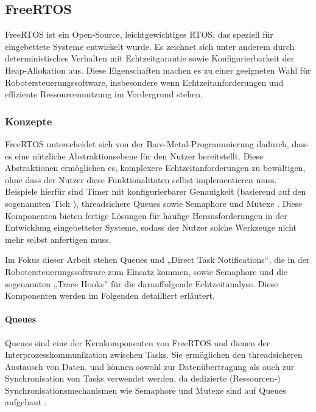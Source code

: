 \subsection{FreeRTOS}

FreeRTOS ist ein Open-Source, leichtgewichtiges \ac{RTOS}, das speziell für
eingebettete Systeme entwickelt wurde. Es zeichnet sich unter anderem durch
deterministisches Verhalten mit Echtzeitgarantie sowie Konfigurierbarkeit der
Heap-Allokation aus. Diese Eigenschaften machen es zu einer geeigneten Wahl für
Robotersteuerungssoftware, insbesondere wenn Echtzeitanforderungen und
effiziente Ressourcennutzung im Vordergrund stehen.

\subsubsection{Konzepte}

FreeRTOS unterscheidet sich von der Bare-Metal-Programmierung dadurch, dass es
eine nützliche Abstraktionsebene für den Nutzer bereitstellt. Diese
Abstraktionen ermöglichen es, komplexere Echtzeitanforderungen zu bewältigen,
ohne dass der Nutzer diese Funktionalitäten selbst implementieren muss.
Beispiele hierfür sind Timer mit konfigurierbarer Genauigkeit (basierend auf den
sogenannten Tick \cite{freertos_rtos_tick, freertos_tick_resolution}),
threadsichere Queues sowie Semaphore und Mutexe \cite{freertos_queues}. Diese
Komponenten bieten fertige Lösungen für häufige Herausforderungen in der
Entwicklung eingebetteter Systeme, sodass der Nutzer solche Werkzeuge nicht mehr
selbst anfertigen muss.

Im Fokus dieser Arbeit stehen Queues und „Direct Task Notifications“, die in der
Robotersteuerungssoftware zum Einsatz kommen, sowie Semaphore und die
sogenannten „Trace Hooks” für die darauffolgende Echtzeitanalyse. Diese
Komponenten werden im Folgenden detailliert erläutert.

\paragraph{Queues}

Queues sind eine der Kernkomponenten von FreeRTOS und dienen der
Interprozesskommunikation zwischen Tasks. Sie ermöglichen den threadsicheren
Austausch von Daten, und können sowohl zur Datenübertragung als auch zur
Synchronisation von Tasks verwendet werden, da dedizierte
(Ressourcen-)\\Synchronisationsmechanismen wie Semaphore und Mutexe sind auf
Queues aufgebaut \cite{freertos_semphr_incl}.


